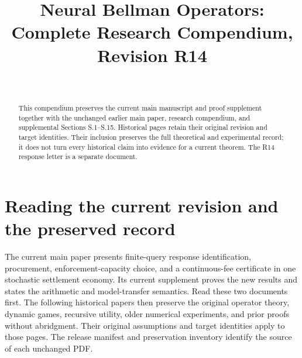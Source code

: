 \documentclass[ecta]{econsocart}
\begin{document}
\begin{frontmatter}
\title{Neural Bellman Operators:\\Complete Research Compendium, Revision R14}
\begin{aug}
\author[id=au1,addressref={add1}]{~}
\address[id=add1]{}
\end{aug}
\begin{abstract}
This compendium preserves the current main manuscript and proof supplement together with the unchanged earlier main paper, research compendium, and supplemental Sections S.1--S.15. Historical pages retain their original revision and target identities. Their inclusion preserves the full theoretical and experimental record; it does not turn every historical claim into evidence for a current theorem. The R14 response letter is a separate document.
\end{abstract}
\end{frontmatter}
\section*{Reading the current revision and the preserved record}
The current main paper presents finite-query response identification, procurement, enforcement-capacity choice, and a continuous-fee certificate in one stochastic settlement economy. Its current supplement proves the new results and states the arithmetic and model-transfer semantics. Read these two documents first. The following historical papers then preserve the original operator theory, dynamic games, recursive utility, older numerical experiments, and prior proofs without abridgment. Their original assumptions and target identities apply to those pages. The release manifest and preservation inventory identify the source of each unchanged PDF.





\end{document}
